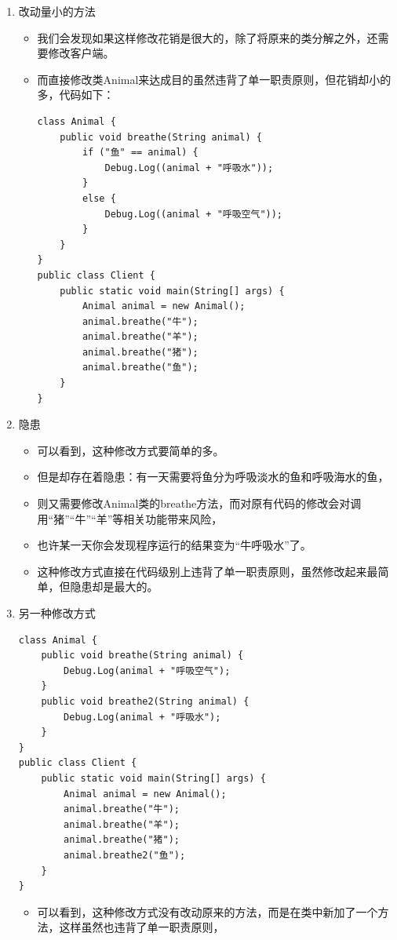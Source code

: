 \documentclass[9pt, b5paper]{article}
\begin{document}
\begin{enumerate}
\item 改动量小的方法
\label{sec:org4874138}
\begin{itemize}
\item 我们会发现如果这样修改花销是很大的，除了将原来的类分解之外，还需要修改客户端。
\item 而直接修改类Animal来达成目的虽然违背了单一职责原则，但花销却小的多，代码如下：
\begin{verbatim}
class Animal {
    public void breathe(String animal) {
        if ("鱼" == animal) {
            Debug.Log((animal + "呼吸水"));
        }
        else {
            Debug.Log((animal + "呼吸空气"));
        }
    }
}
public class Client {
    public static void main(String[] args) {
        Animal animal = new Animal();
        animal.breathe("牛");
        animal.breathe("羊");
        animal.breathe("猪");
        animal.breathe("鱼");
    }
}
\end{verbatim}
\end{itemize}
\item 隐患
\label{sec:org253a2a6}
\begin{itemize}
\item 可以看到，这种修改方式要简单的多。
\item 但是却存在着隐患：有一天需要将鱼分为呼吸淡水的鱼和呼吸海水的鱼，
\item 则又需要修改Animal类的breathe方法，而对原有代码的修改会对调用“猪”“牛”“羊”等相关功能带来风险，
\item 也许某一天你会发现程序运行的结果变为“牛呼吸水”了。
\item 这种修改方式直接在代码级别上违背了单一职责原则，虽然修改起来最简单，但隐患却是最大的。
\end{itemize}
\item 另一种修改方式
\label{sec:org18f4646}
\begin{verbatim}
class Animal {
    public void breathe(String animal) {
        Debug.Log(animal + "呼吸空气");
    }
    public void breathe2(String animal) {
        Debug.Log(animal + "呼吸水");
    }
}
public class Client {
    public static void main(String[] args) {
        Animal animal = new Animal();
        animal.breathe("牛");
        animal.breathe("羊");
        animal.breathe("猪");
        animal.breathe2("鱼");
    }
}
\end{verbatim}
\begin{itemize}
\item 可以看到，这种修改方式没有改动原来的方法，而是在类中新加了一个方法，这样虽然也违背了单一职责原则，

\end{itemize}
\end{enumerate}
\end{document}
